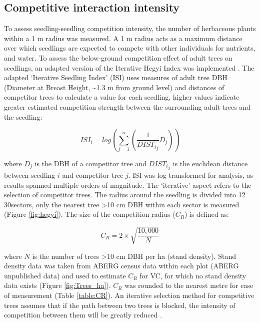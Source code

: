 \documentclass[a4paper,10pt,]{report}
\begin{document}
\subsection*{Competitive interaction intensity}

To assess seedling-seedling competition intensity, the number of herbaceous plants within a 1 m radius was measured. A 1 m radius acts as a maximum distance over which seedlings are expected to compete with other individuals for nutrients, and water. To assess the below-ground competition effect of adult trees on seedlings, an adapted version of the Iterative Hegyi Index was implemented \citep{Hegyi1974, Lee2004, Seifert2014}. The adapted `Iterative Seedling Index' (ISI) uses measures of adult tree DBH (Diameter at Breast Height, \textasciitilde1.3 m from ground level) and distances of competitor trees to calculate a value for each seedling, higher values indicate greater estimated competition strength between the surrounding adult trees and the seedling:

\begin{equation}
\label{eq:ISI}
ISI_i = log(\sum_{j=1}^n (\frac{1}{{DIST_i}_j} D_j))
\end{equation}

where $D_j$ is the DBH of a competitor tree and ${{DIST_i}_j}$ is the euclidean distance between seedling $i$ and competitor tree $j$. ISI was log transformed for analysis, as results spanned multiple orders of magnitude. The `iterative' aspect refers to the selection of competitor trees. The radius around the seedling is divided into 12 30\textdegree  sectors, only the nearest tree >10 cm DBH within each sector is measured (Figure \ref{fig:hegyi}). The size of the competition radius ($C_R$) is defined as:

\begin{equation}
\label{eq:CR}
C_R = 2 \times \sqrt{\frac{10,000}{N}}
\end{equation}

where $N$ is the number of trees \textgreater10 cm DBH per ha (stand density). Stand density data was taken from ABERG census data within each plot (ABERG unpublished data) and used to estimate $C_R$ for VC, for which no stand density data exists (Figure \ref{fig:Trees_ha}). $C_R$ was rounded to the nearest metre for ease of measurement (Table \ref{table:CR}). An iterative selection method for competitive trees assumes that if the path between two trees is blocked, the intensity of competition between them will be greatly reduced \citep{Gadow1999}.
\end{document}
